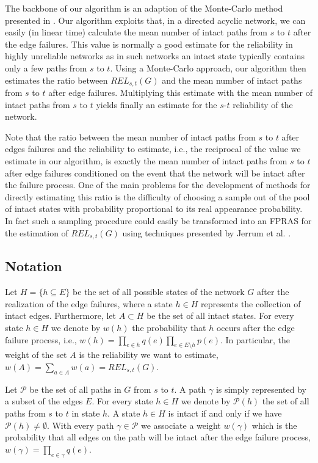 \documentclass{article}
\begin{document}
The backbone of our algorithm is an
adaption of the \mbox{Monte-Carlo} method presented in
\cite{karp_1985_montecarlo}.
Our algorithm exploits that, in a directed acyclic network,
we can easily (in linear time) calculate
the mean number of intact paths from $s$ to $t$ after the edge failures.
This value is normally a good estimate for the reliability
in highly unreliable networks as in such networks an intact
state typically contains only
a few paths from $s$ to $t$. Using a \mbox{Monte-Carlo} approach,
our algorithm then estimates the ratio between
$\mathit{REL}_{s,t}(G)$ and the mean number of intact paths from $s$ to $t$ after edge
failures. Multiplying this estimate
with the mean number of intact paths from $s$ to $t$ yields
finally an estimate for the $s$-$t$ reliability of the network.

Note that the ratio between the mean number of intact paths from $s$ to $t$ after
edges failures and the reliability to estimate, i.e., the reciprocal of the value we
estimate in our algorithm, is exactly the mean number of
intact paths from $s$ to $t$ after edge failures conditioned on the event that
the network will be intact after the failure process. One of the main problems for
the development of methods for directly estimating this ratio is the difficulty
of choosing a sample out of the pool of intact states with probability proportional to
its real appearance probability. In fact such a sampling procedure could easily be
transformed into an FPRAS for the estimation of $\mathit{REL}_{s,t}(G)$
using techniques presented by Jerrum et al. \cite{jerrum_1986_random}.


\subsection{Notation}
Let $H=\{h\subseteq E\}$ be the set of all
possible states of the network $G$ after the realization of the edge failures,
where a state $h\in H$ represents the collection of intact
edges.
Furthermore, let $A\subset H$ be the set of all intact states.
For every state $h\in H$
we denote by $w(h)$ the probability that $h$ occurs after
the edge failure process, i.e., $w(h)=\prod_{e\in h}q(e)\prod_{e\in E\setminus h}p(e)$\;.
In particular, the weight of the set $A$ is the reliability
we want to estimate, $w(A)=\sum_{a\in A}w(a)=\mathit{REL}_{s,t}(G)$.

Let $\mathcal{P}$ be the set of all paths in
$G$ from $s$ to $t$. A path $\gamma$ is simply represented
by a subset of the edges $E$. For every state $h\in H$ we
denote by $\mathcal{P}(h)$ the set
of all paths from $s$ to $t$ in state $h$. A state $h\in H$
is intact if and only if we have
$\mathcal{P}(h)\neq \emptyset$.
With every path $\gamma \in \mathcal{P}$
we associate a weight $w(\gamma)$ which is the probability
that all edges on the path will be intact after the edge
failure process, $w(\gamma)=\prod_{e\in \gamma} q(e)$\;.
\end{document}
